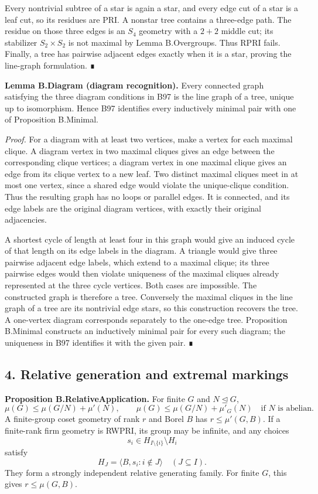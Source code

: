 \documentclass[
  11pt,
  a4paper,
]{article}
\begin{document}
Every nontrivial subtree of a star is again a star, and every edge cut
of a star is a leaf cut, so its residues are PRI. A nonstar tree
contains a three-edge path. The residue on those three edges is an
\(S_4\) geometry with a \(2+2\) middle cut; its stabilizer
\(S_2\times S_2\) is not maximal by Lemma B.Overgroups. Thus RPRI fails.
Finally, a tree has pairwise adjacent edges exactly when it is a star,
proving the line-graph formulation. ∎

\textbf{Lemma B.Diagram (diagram recognition).} Every connected graph
satisfying the three diagram conditions in B97 is the line graph of a
tree, unique up to isomorphism. Hence B97 identifies every inductively
minimal pair with one of Proposition B.Minimal.

\emph{Proof.} For a diagram with at least two vertices, make a vertex
for each maximal clique. A diagram vertex in two maximal cliques gives
an edge between the corresponding clique vertices; a diagram vertex in
one maximal clique gives an edge from its clique vertex to a new leaf.
Two distinct maximal cliques meet in at most one vertex, since a shared
edge would violate the unique-clique condition. Thus the resulting graph
has no loops or parallel edges. It is connected, and its edge labels are
the original diagram vertices, with exactly their original adjacencies.

A shortest cycle of length at least four in this graph would give an
induced cycle of that length on its edge labels in the diagram. A
triangle would give three pairwise adjacent edge labels, which extend to
a maximal clique; its three pairwise edges would then violate uniqueness
of the maximal cliques already represented at the three cycle vertices.
Both cases are impossible. The constructed graph is therefore a tree.
Conversely the maximal cliques in the line graph of a tree are its
nontrivial edge stars, so this construction recovers the tree. A
one-vertex diagram corresponds separately to the one-edge tree.
Proposition B.Minimal constructs an inductively minimal pair for every
such diagram; the uniqueness in B97 identifies it with the given pair. ∎

\subsection{4. Relative generation and extremal
markings}\label{relative-generation-and-extremal-markings}

\textbf{Proposition B.RelativeApplication.} For finite \(G\) and
\(N\unlhd G\), \[
\mu(G)\leq\mu(G/N)+\mu'(N),\qquad
\mu(G)\leq\mu(G/N)+\mu'_G(N)\quad\text{if }N\text{ is abelian}.
\tag{4.1}
\] A finite-group coset geometry of rank \(r\) and Borel \(B\) has
\(r\leq\mu'(G,B)\). If a finite-rank firm geometry is RWPRI, its group
may be infinite, and any choices \[
s_i\in H_{I\setminus\{i\}}\setminus H_i
\tag{4.2}
\] satisfy \[
H_J=\langle B,s_i:i\notin J\rangle\quad(J\subseteq I).
\tag{4.3}
\] They form a strongly independent relative generating family. For
finite \(G\), this gives \(r\leq\mu(G,B)\).
\end{document}
